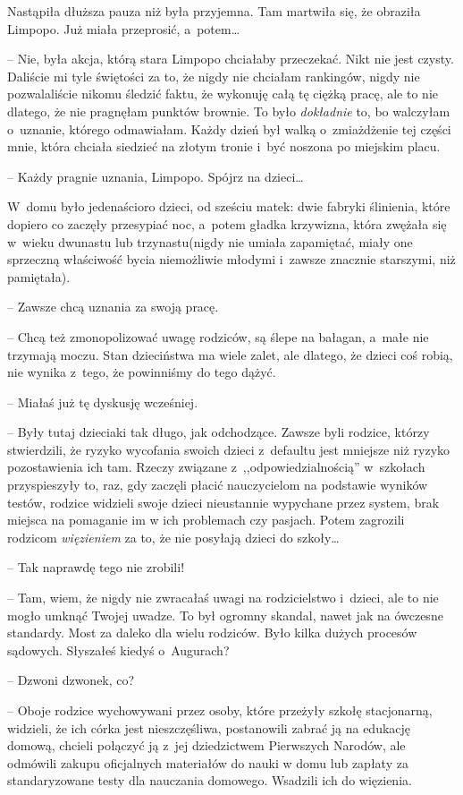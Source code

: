 \documentclass[oneside,polish,11pt,sfheadings]{mwbk}
\begin{document}
Nastąpiła dłuższa pauza niż była przyjemna. Tam martwiła się, że
obraziła Limpopo. Już miała przeprosić, a~potem\ldots 

-- Nie, była akcja, którą stara Limpopo chciałaby przeczekać. Nikt nie
jest czysty. Daliście mi tyle świętości za to, że nigdy nie chciałam
rankingów, nigdy nie pozwalaliście nikomu śledzić faktu, że wykonuję
całą tę ciężką pracę, ale to nie dlatego, że nie pragnęłam punktów
brownie. To było \textit{dokładnie} to, bo walczyłam o~uznanie, którego
odmawiałam. Każdy dzień był walką o~zmiażdżenie tej części mnie, która
chciała siedzieć na złotym tronie i~być noszona po miejskim placu.

-- Każdy pragnie uznania, Limpopo. Spójrz na dzieci\ldots 

 W~domu było
jedenaścioro dzieci, od sześciu matek: dwie fabryki ślinienia, które
dopiero co zaczęły przesypiać noc, a~potem gładka krzywizna, która
zwężała się w~wieku dwunastu lub trzynastu(nigdy nie umiała zapamiętać,
miały one sprzeczną właściwość bycia niemożliwie młodymi i~zawsze
znacznie starszymi, niż pamiętała). 

-- Zawsze chcą uznania za swoją
pracę.

-- Chcą też zmonopolizować uwagę rodziców, są ślepe na bałagan, a~małe
nie trzymają moczu. Stan dzieciństwa ma wiele zalet, ale dlatego, że
dzieci coś robią, nie wynika z~tego, że powinniśmy do tego dążyć.

-- Miałaś już tę dyskusję wcześniej.

-- Były tutaj dzieciaki tak długo, jak odchodzące. Zawsze byli rodzice,
którzy stwierdzili, że ryzyko wycofania swoich dzieci z~defaultu jest
mniejsze niż ryzyko pozostawienia ich tam. Rzeczy związane z~,,odpowiedzialnością'' w~szkołach przyspieszyły to, raz, gdy zaczęli
płacić nauczycielom na podstawie wyników testów, rodzice widzieli swoje
dzieci nieustannie wypychane przez system, brak miejsca na pomaganie im
w ich problemach czy pasjach. Potem zagrozili rodzicom \textit{więzieniem}
za to, że nie posyłają dzieci do szkoły\ldots 

-- Tak naprawdę tego nie zrobili!

-- Tam, wiem, że nigdy nie zwracałaś uwagi na rodzicielstwo i~dzieci, ale
to nie mogło umknąć Twojej uwadze. To był ogromny skandal, nawet jak na
ówczesne standardy. Most za daleko dla wielu rodziców. Było kilka dużych
procesów sądowych. Słyszałeś kiedyś o~Augurach?

-- Dzwoni dzwonek, co?

-- Oboje rodzice wychowywani przez osoby, które przeżyły szkołę
stacjonarną, widzieli, że ich córka jest nieszczęśliwa, postanowili
zabrać ją na edukację domową, chcieli połączyć ją z~jej dziedzictwem
Pierwszych Narodów, ale odmówili zakupu oficjalnych materiałów do nauki
w domu lub zapłaty za standaryzowane testy dla nauczania domowego.
Wsadzili ich do więzienia.
\end{document}
